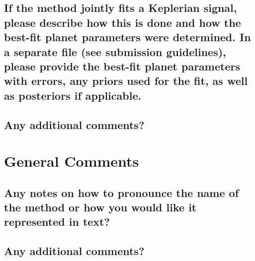 \documentclass[12pt]{article}
\numberwithin{equation}{section}
\begin{document}
\subsection{If the method jointly fits a Keplerian signal, please describe how this is done and how the best-fit planet parameters were determined.  In a separate file (see submission guidelines), please provide the best-fit planet parameters with errors, any priors used for the fit, as well as posteriors if applicable.}

\subsection{Any additional comments?}


\section{General Comments}
\subsection{Any notes on how to pronounce the name of the method or how you would like it represented in text?}

\subsection{Any additional comments?}
\end{document}
